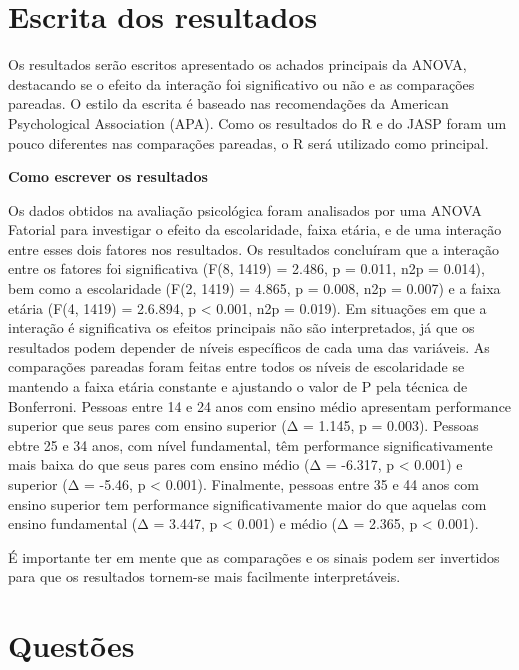 \documentclass[
]{book}
\begin{document}
\hypertarget{escrita-dos-resultados-8}{%
\section{Escrita dos resultados}\label{escrita-dos-resultados-8}}

Os resultados serão escritos apresentado os achados principais da ANOVA, destacando se o efeito da interação foi significativo ou não e as comparações pareadas. O estilo da escrita é baseado nas recomendações da American Psychological Association (APA). Como os resultados do R e do JASP foram um pouco diferentes nas comparações pareadas, o R será utilizado como principal.

\begin{writing}
\textbf{Como escrever os resultados}

Os dados obtidos na avaliação psicológica foram analisados por uma ANOVA
Fatorial para investigar o efeito da escolaridade, faixa etária, e de
uma interação entre esses dois fatores nos resultados. Os resultados
concluíram que a interação entre os fatores foi significativa (F(8,
1419) = 2.486, p = 0.011, n2p = 0.014), bem como a escolaridade (F(2,
1419) = 4.865, p = 0.008, n2p = 0.007) e a faixa etária (F(4, 1419) =
2.6.894, p \textless{} 0.001, n2p = 0.019). Em situações em que a
interação é significativa os efeitos principais não são interpretados,
já que os resultados podem depender de níveis específicos de cada uma
das variáveis. As comparações pareadas foram feitas entre todos os
níveis de escolaridade se mantendo a faixa etária constante e ajustando
o valor de P pela técnica de Bonferroni. Pessoas entre 14 e 24 anos com
ensino médio apresentam performance superior que seus pares com ensino
superior (Δ = 1.145, p = 0.003). Pessoas ebtre 25 e 34 anos, com nível
fundamental, têm performance significativamente mais baixa do que seus
pares com ensino médio (Δ = -6.317, p \textless{} 0.001) e superior (Δ =
-5.46, p \textless{} 0.001). Finalmente, pessoas entre 35 e 44 anos com
ensino superior tem performance significativamente maior do que aquelas
com ensino fundamental (Δ = 3.447, p \textless{} 0.001) e médio (Δ =
2.365, p \textless{} 0.001).
\end{writing}

É importante ter em mente que as comparações e os sinais podem ser invertidos para que os resultados tornem-se mais facilmente interpretáveis.

\hypertarget{questuxf5es-4}{%
\section{Questões}\label{questuxf5es-4}}
\end{document}
